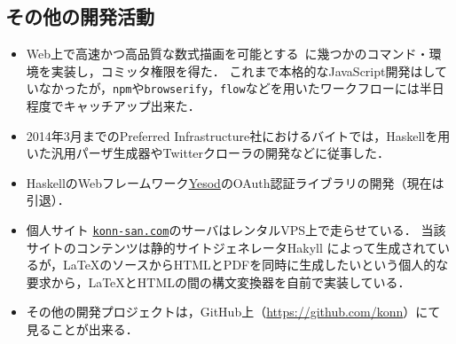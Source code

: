 \documentclass[a4j]{ltjsarticle}
\renewcommand{\emph}[1]{\textsf{\textgt{#1}}}
\begin{document}
\begin{refsection}
\subsection*{その他の開発活動}
\begin{itemize}
 \item Web上で高速かつ高品質な数式描画を可能とする\emph{KaTeX}~\cite{KhanAcademy:2018ol}に幾つかのコマンド・環境を実装し，コミッタ権限を得た．
       これまで本格的なJavaScript開発はしていなかったが，\texttt{npm}や\texttt{browserify}，\texttt{flow}などを用いたワークフローには半日程度でキャッチアップ出来た．
 \item 2014年3月までのPreferred Infrastructure社におけるバイトでは，Haskellを用いた汎用パーザ生成器やTwitterクローラの開発などに従事した．
 \item HaskellのWebフレームワーク\href{https://www.yesodweb.com}{Yesod}のOAuth認証ライブラリの開発（現在は引退）．
 \item 個人サイト \href{https://konn-san.com}{\nolinkurl{konn-san.com}}のサーバはレンタルVPS上で走らせている．
       当該サイトのコンテンツは静的サイトジェネレータHakyll \cite{Jeugt:2018pc}によって生成されているが，\LaTeX{}のソースからHTMLとPDFを同時に生成したいという個人的な要求から，\LaTeX{}とHTMLの間の構文変換器を自前で実装している．
 \item その他の開発プロジェクトは，GitHub上（\url{https://github.com/konn}）にて見ることが出来る．
\end{itemize}

\printbibliography[title=参考文献,heading=subbibliography]
\end{refsection}
\end{document}

